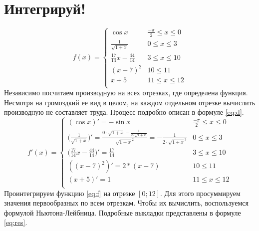 \documentclass[30pt]{article}
\begin{document}
    \section{Интегрируй!}
        \begin{equation}
            f(x) = \begin{cases}
                \cos{x} & \frac{-\pi}{2} \leqslant x \leqslant 0 \\
                \frac{1}{\sqrt{1 + x}} & 0 \leqslant x \leqslant 3 \\
                \frac{17}{14}x - \frac{44}{14} & 3 \leqslant x \leqslant 10 \\
                (x - 7)^2 & 10 \leqslant  11 \\
                x + 5 & 11 \leqslant x \leqslant 12 \\
            \end{cases}
            \label{eq:f}
        \end{equation}
        Независимо посчитаем производную на всех отрезках, где определена функция. Несмотря на громоздкий ее вид в целом, на каждом отдельном отрезке вычислить производную не составляет труда. Процесс подробно описан в формуле \ref{eq:d}.
        \begin{equation}
            f'(x) = \begin{cases}
                (\cos{x})' = -\sin{x} & \frac{-\pi}{2} \leqslant x \leqslant 0 \\
                \bigl(\frac{1}{\sqrt{1 + x}}\bigr)' = \frac{0 \cdot \sqrt{1 + x} - \frac{1}{2 \cdot \sqrt{1 + x}}}{\sqrt{1 + x}^2} = -\frac{1}{2 \cdot \sqrt{1 + x}^3} & 0 \leqslant x \leqslant 3 \\
                \bigl(\frac{17}{14}x - \frac{44}{14}\bigr)' = \frac{17}{14} & 3 \leqslant x \leqslant 10 \\
                ((x - 7)^2)' = 2 * (x - 7) & 10 \leqslant  11 \\
                (x + 5)' = 1 & 11 \leqslant x \leqslant 12 \\
            \end{cases}
            \label{eq:d}
        \end{equation}
        Проинтегрируем функцию \ref{eq:f} на отрезке $[0;12]$. Для этого просуммируем значения первообразных по всем отрезкам. Чтобы их вычислить, воспользуемся формулой Ньютона-Лейбница. Подробные выкладки представлены в формуле \ref{eq:res}. 
\end{document}

